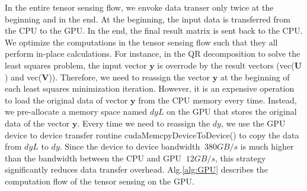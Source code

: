 \documentclass[futureinternet,article,submit,moreauthors,pdftex,10pt,a4paper]{Definitions/mdpi}
\theoremstyle{plain}
\theoremstyle{definition}
\theoremstyle{remark}
\begin{document}
In the entire tensor sensing flow, we envoke data transer only twice at the beginning and in the end. At the beginning, the input data is transferred from the CPU to the GPU. In the end, the final result matrix is sent back to the CPU. We optimize the computations in the tensor sensing flow such that they all perform in-place calculations. For instance, in the QR decomposition to solve the least squares problem, the input vector $\mathbf{y}$ is overrode by the result vectors (vec($\mathbf{U}$) and  vec($\mathbf{V}$)). Therefore, we need to reassign the vector $\mathbf{y}$ at the beginning of each least squares minimization iteration. However, it is an expensive operation to load the original data of vector $\mathbf{y}$ from the CPU memory every time. Instead, we pre-allocate a memory space named  $dyL$ on the GPU that stores the original data of the vector $\mathbf{y}$. Every time we need to reassign the $dy$, we use the GPU device to device transfer routine cudaMemcpyDeviceToDevice() to copy the data from $dyL$ to $dy$. Since the device to device bandwidth $~380 GB/s$ is much higher than the bandwidth between the CPU and GPU $~12 GB/s$, this strategy significantly reduces data transfer overhead. Alg.\ref{alg:GPU} describes the computation flow of the tensor sensing on the GPU.

\end{document}
